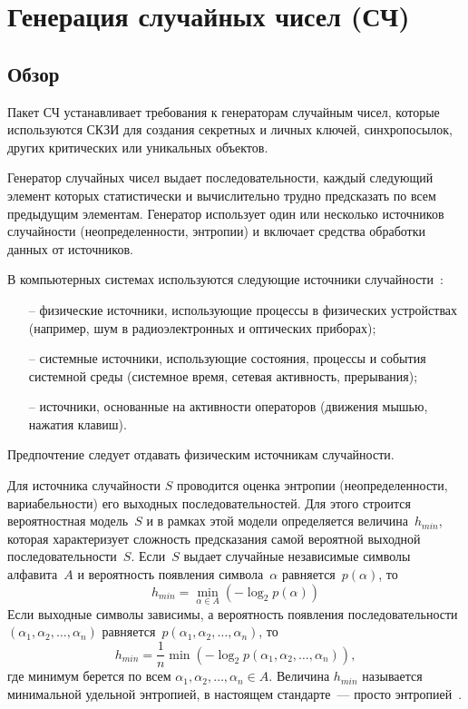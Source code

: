 \section{Генерация случайных чисел (СЧ)}\label{RN}

\subsection{Обзор}\label{RN.Intro}

Пакет СЧ устанавливает требования к генераторам случайным чисел, которые
используются СКЗИ для создания секретных и личных ключей, синхропосылок, других
критических или уникальных объектов.

Генератор случайных чисел выдает последовательности, каждый следующий элемент
которых статистически и вычислительно трудно предсказать по всем предыдущим
элементам.
%
Генератор использует один или несколько источников случайности
(неопределенности, энтропии) и включает средства обработки данных от источников.

В компьютерных системах используются следующие источники
случайности~:
\begin{itemize}
\item[--]
физические источники, использующие процессы в физических устройствах (например,
шум в радиоэлектронных и оптических приборах);

\item[--]
системные источники, использующие состояния, процессы и события системной среды
(системное время, сетевая активность, прерывания);

\item[--]
источники, основанные на активности операторов (движения мышью, нажатия клавиш).
\end{itemize}

Предпочтение следует отдавать физическим источникам случайности.

Для источника случайности $S$ проводится оценка энтропии (неопределенности,
вариабельности) его выходных последовательностей. Для этого строится
вероятностная модель~$S$ и в рамках этой модели определяется величина~$h_{min}$,
которая характеризует сложность предсказания самой вероятной выходной 
последовательности~$S$.  
%
Если~$S$ выдает случайные независимые символы алфавита~$A$ и
вероятность появления символа~$\alpha$ равняется~$p(\alpha)$, то
$$
h_{min}=\min_{\alpha\in A}(-\log_2 p(\alpha))
$$
Если выходные символы зависимы, а вероятность появления 
последовательности $(\alpha_1,\alpha_2,\ldots,\alpha_n)$ 
равняется~$p(\alpha_1,\alpha_2,\ldots,\alpha_n)$, 
то
$$
h_{min}=\frac{1}{n}\min(-\log_2 p(\alpha_1,\alpha_2,\ldots,\alpha_n)),
$$
где минимум берется по всем $\alpha_1,\alpha_2,\ldots,\alpha_n\in A$.
%
Величина $h_{min}$ называется минимальной удельной энтропией,
в настоящем стандарте~--- просто энтропией~.


